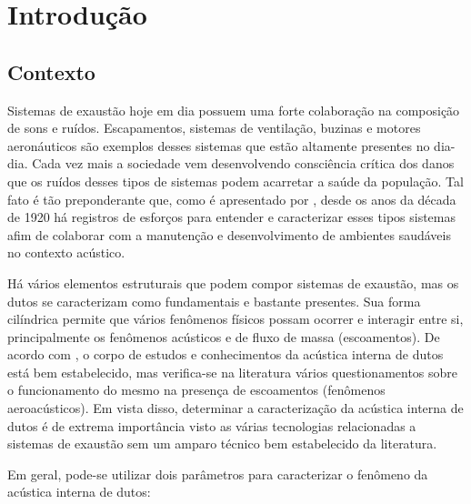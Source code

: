 \chapter{Introdução}
\label{chapter:introdcao}

\section{Contexto}

Sistemas de exaustão hoje em dia possuem uma forte colaboração na composição de sons e ruídos. Escapamentos, sistemas de ventilação, buzinas e motores aeronáuticos são exemplos desses sistemas que estão altamente presentes no dia-dia. Cada vez mais a sociedade vem desenvolvendo consciência crítica dos danos que os ruídos desses tipos de sistemas podem acarretar a saúde da população. Tal fato é tão preponderante que, como é apresentado por , desde os anos da década de 1920 há registros de esforços para entender e caracterizar esses tipos sistemas afim de colaborar com a manutenção e desenvolvimento de ambientes saudáveis no contexto acústico.

Há vários elementos estruturais que podem compor sistemas de exaustão, mas os dutos se caracterizam como fundamentais e bastante presentes. Sua forma cilíndrica permite que vários fenômenos físicos possam ocorrer e interagir entre si, principalmente os fenômenos acústicos e de fluxo de massa (escoamentos). De acordo com , o corpo de estudos e conhecimentos da acústica interna de dutos está bem estabelecido, mas verifica-se na literatura vários questionamentos sobre o funcionamento do mesmo na presença de escoamentos (fenômenos aeroacústicos). Em vista disso, determinar a caracterização da acústica interna de dutos é de extrema importância visto as várias tecnologias relacionadas a sistemas de exaustão sem um amparo técnico bem estabelecido da literatura.

Em geral, pode-se utilizar dois parâmetros para caracterizar o fenômeno da acústica interna de dutos:

